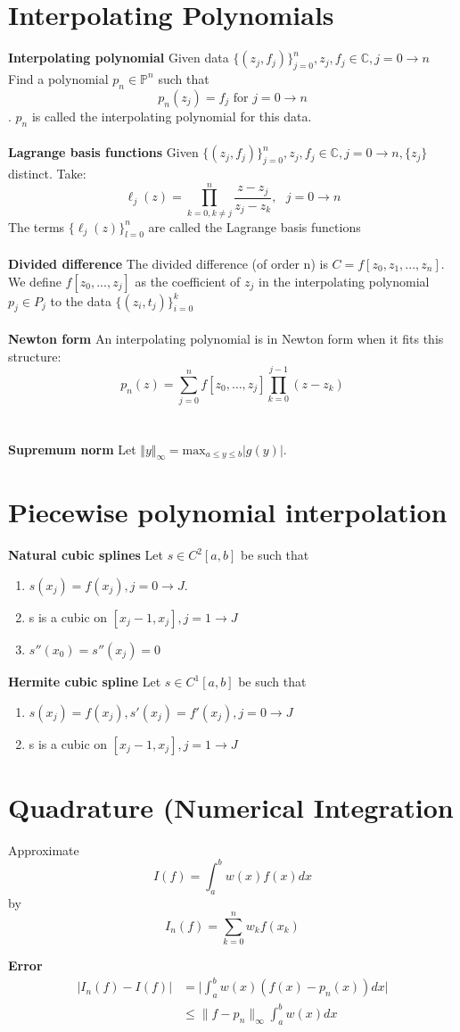 \documentclass{article}
\begin{document}
\section{Interpolating Polynomials}
\textbf{Interpolating polynomial}
Given data $\{(z_j,f_j)\}^n_{j=0},z_j,f_j \in \mathbb{C},j = 0 \to n$ Find a polynomial $p_n \in \mathbb{P}^n$ such that $$p_n(z_j)=f_j \text{ for } j=0 \to n$$.
$p_n$ is called the interpolating polynomial for this data.
\\
\\
\textbf{Lagrange basis functions}
Given $\{(z_j,f_j)\}^n_{j=0},z_j,f_j \in \mathbb{C},j = 0 \to n,\{z_j\}$ distinct. Take: 
$$
\ell_j(z) = \prod^n_{k=0,  k \ne j} \frac{z - z_j}{z_j - z_k}, \hspace{8pt} j = 0 \to n
$$
The terms $\{ \ell_j (z) \}_{l=0}^{n}$ are called the Lagrange basis functions
\\
\\
\textbf{Divided difference}
The divided difference (of order n) is $C = f[z_0,z_1,...,z_n]$. We define $f[z_0,...,z_j]$ as the coefficient of $z_j$ in the interpolating polynomial $p_j \in P_j$ to the data $\{(z_i,t_j)\}^k_{i=0}$
\\
\\
\textbf{Newton form} An interpolating polynomial is in Newton form when it fits this structure: 
$$ p_n(z) = \sum_{j=0}^n f[z_0, \dots , z_j] \prod_{k=0}^{j-1} (z - z_k)
$$
\\
\\
\textbf{Supremum norm} Let $ \Vert y \Vert_\infty = \text{max}_ { a \leq y \leq b }| g(y)|$.
\section{Piecewise polynomial interpolation}

\textbf{Natural cubic splines} Let $s \in C^2[a, b]$ be such that
\begin{enumerate}
    \item  $s(x_j)=f(x_j),j=0 \to J$.
    \item s is a cubic on $[x_j−1,x_j],j=1 \to J$
    \item $ s''(x_0) = s''(x_j ) = 0$
\end{enumerate}
\textbf{Hermite cubic spline}  Let $s \in C^1[a, b]$ be such that
\begin{enumerate}
    \item $s(x_j) = f(x_j),s′(x_j) = f′(x_j), j = 0 \to J$
    \item s is a cubic on $[x_j−1,x_j],j=1 \to J$
\end{enumerate}

\section{Quadrature (Numerical Integration}

Approximate
$$
I(f) = \int_a^b w(x)f(x) dx 
$$
by
$$
I_n(f) = \sum_{k=0}^n w_k f(x_k)
$$

\textbf{Error}
\begin{align*}
    |I_n(f) - I(f) | &= \bigg | \int_a^b w(x) (f(x) - p_n(x)) dx \bigg | \\
    & \leq \lVert f - p_n \rVert_\infty \int^b_a w(x) dx
\end{align*}
\end{document}
